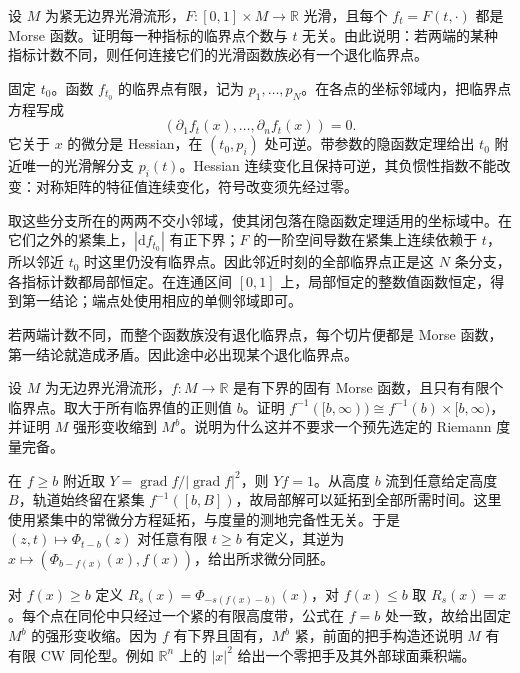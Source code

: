 \begin{exercise}\label{g2:ex:morse-family-critical-count}
	设 \(M\) 为紧无边界光滑流形，\(F:[0,1]\times M\to\mathbb R\) 光滑，且每个 \(f_t=F(t,\cdot)\) 都是 Morse 函数。证明每一种指标的临界点个数与 \(t\) 无关。由此说明：若两端的某种指标计数不同，则任何连接它们的光滑函数族必有一个退化临界点。
\end{exercise}
\begin{solution}
	固定 \(t_0\)。函数 \(f_{t_0}\) 的临界点有限，记为 \(p_1,\ldots,p_N\)。在各点的坐标邻域内，把临界点方程写成
	\[
		(\partial_1f_t(x),\ldots,\partial_nf_t(x))=0.
	\]
	它关于 \(x\) 的微分是 Hessian，在 \((t_0,p_i)\) 处可逆。带参数的隐函数定理给出 \(t_0\) 附近唯一的光滑解分支 \(p_i(t)\)。Hessian 连续变化且保持可逆，其负惯性指数不能改变：对称矩阵的特征值连续变化，符号改变须先经过零。

	取这些分支所在的两两不交小邻域，使其闭包落在隐函数定理适用的坐标域中。在它们之外的紧集上，\(|\mathrm df_{t_0}|\) 有正下界；\(F\) 的一阶空间导数在紧集上连续依赖于 \(t\)，所以邻近 \(t_0\) 时这里仍没有临界点。因此邻近时刻的全部临界点正是这 \(N\) 条分支，各指标计数都局部恒定。在连通区间 \([0,1]\) 上，局部恒定的整数值函数恒定，得到第一结论；端点处使用相应的单侧邻域即可。

	若两端计数不同，而整个函数族没有退化临界点，每个切片便都是 Morse 函数，第一结论就造成矛盾。因此途中必出现某个退化临界点。
\end{solution}

\begin{exercise}\label{g2:ex:morse-finite-critical-end}
	设 \(M\) 为无边界光滑流形，\(f:M\to\mathbb R\) 是有下界的固有 Morse 函数，且只有有限个临界点。取大于所有临界值的正则值 \(b\)。证明 \(f^{-1}([b,\infty))\cong f^{-1}(b)\times[b,\infty)\)，并证明 \(M\) 强形变收缩到 \(M^b\)。说明为什么这并不要求一个预先选定的 Riemann 度量完备。
\end{exercise}
\begin{solution}
	在 \(f\ge b\) 附近取 \(Y=\operatorname{grad}f/|\operatorname{grad}f|^2\)，则 \(Yf=1\)。从高度 \(b\) 流到任意给定高度 \(B\)，轨道始终留在紧集 \(f^{-1}([b,B])\)，故局部解可以延拓到全部所需时间。这里使用紧集中的常微分方程延拓，与度量的测地完备性无关。于是 \((z,t)\mapsto\Phi_{t-b}(z)\) 对任意有限 \(t\ge b\) 有定义，其逆为 \(x\mapsto(\Phi_{b-f(x)}(x),f(x))\)，给出所求微分同胚。

	对 \(f(x)\ge b\) 定义 \(R_s(x)=\Phi_{-s(f(x)-b)}(x)\)，对 \(f(x)\le b\) 取 \(R_s(x)=x\)。每个点在同伦中只经过一个紧的有限高度带，公式在 \(f=b\) 处一致，故给出固定 \(M^b\) 的强形变收缩。因为 \(f\) 有下界且固有，\(M^b\) 紧，前面的把手构造还说明 \(M\) 有有限 CW 同伦型。例如 \(\mathbb R^n\) 上的 \(|x|^2\) 给出一个零把手及其外部球面乘积端。
\end{solution}

